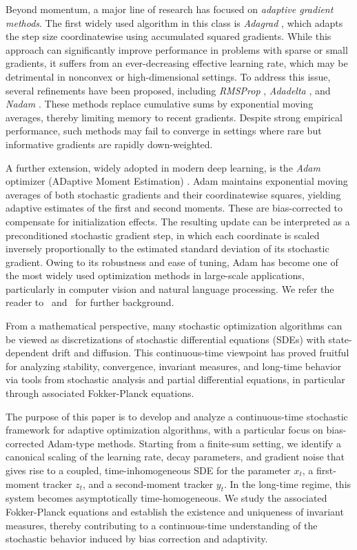 \documentclass[11pt, a4paper,leqno]{amsart}
\theoremstyle{definition}
\numberwithin{equation}{section}
\begin{document}
Beyond momentum, a major line of research has focused on \emph{adaptive gradient methods}. The first widely used algorithm in this class is \emph{Adagrad} \cite{Duchi2011,McMahanStreeter2010}, which adapts the step size coordinatewise using accumulated squared gradients. While this approach can significantly improve performance in problems with sparse or small gradients, it suffers from an ever-decreasing effective learning rate, which may be detrimental in nonconvex or high-dimensional settings. To address this issue, several refinements have been proposed, including \emph{RMSProp} \cite{TielemanHinton2012}, \emph{Adadelta} \cite{Zeiler2012}, and \emph{Nadam} \cite{Dozat2016}. These methods replace cumulative sums by exponential moving averages, thereby limiting memory to recent gradients. Despite strong empirical performance, such methods may fail to converge in settings where rare but informative gradients are rapidly down-weighted.

A further extension, widely adopted in modern deep learning, is the \emph{Adam} optimizer (ADaptive Moment Estimation) \cite{KingmaBa2015}. Adam maintains exponential moving averages of both stochastic gradients and their coordinatewise squares, yielding adaptive estimates of the first and second moments. These are bias-corrected to compensate for initialization effects. The resulting update can be interpreted as a preconditioned stochastic gradient step, in which each coordinate is scaled inversely proportionally to the estimated standard deviation of its stochastic gradient. Owing to its robustness and ease of tuning, Adam has become one of the most widely used optimization methods in large-scale applications, particularly in computer vision and natural language processing. We refer the reader to~\cite{E2020,Ruder2016,Sun2019} and~\cite{Bach2024,GarrigosGower2023,JentzenIntroDL2023} for further background.



From a mathematical perspective, many stochastic optimization algorithms can be viewed as discretizations of stochastic differential equations (SDEs) with state-dependent drift and diffusion. This continuous-time viewpoint has proved fruitful for analyzing stability, convergence, invariant measures, and long-time behavior via tools from stochastic analysis and partial differential equations, in particular through associated Fokker-Planck equations.



The purpose of this paper is to develop and analyze a continuous-time stochastic framework for adaptive optimization algorithms, with a particular focus on bias-corrected Adam-type methods. Starting from a finite-sum setting, we identify a canonical scaling of the learning rate, decay parameters, and gradient noise that gives rise to a coupled, time-inhomogeneous SDE for the parameter $x_t$, a first-moment tracker $z_t$, and a second-moment tracker $y_t$. In the long-time regime, this system becomes asymptotically time-homogeneous. We study the associated Fokker-Planck equations and establish the existence and uniqueness of invariant measures, thereby contributing to a continuous-time understanding of the stochastic behavior induced by bias correction and adaptivity.
\end{document}
